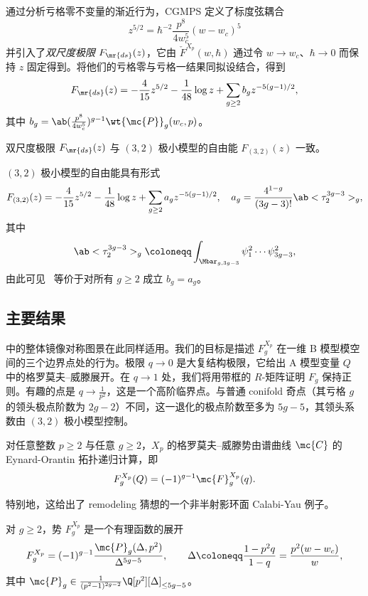 通过分析亏格零不变量的渐近行为，CGMPS 定义了标度弦耦合
\[ z^{5/2} = \hbar^{-2} \frac{p^8}{4w_c^5}(w-w_c)^5 \]
并引入了\textit{双尺度极限} \(F_{\mr{ds}}(z)\)，它由 \(\check{F}^{X_p}(w,\hbar)\) 通过令 \(w \to w_c\)、\(\hbar \to 0\) 而保持 \(z\) 固定得到。将他们的亏格零与亏格一结果同拟设结合，得到
\[ F_{\mr{ds}}(z) = -\frac{4}{15}z^{5/2} - \frac{1}{48}\log z + \sum_{g \geq 2} b_g z^{-5(g-1)/2}, \]
其中 \(b_g = \ab(\frac{p^8}{4w_c^5})^{g-1}\wt{\mc{P}}_g(w_c,p)\)。

\begin{conj}%
\label{conj:cgmps}
    双尺度极限 \(F_{\mr{ds}}(z)\) 与 \((3,2)\) 极小模型的自由能 \(F_{(3,2)}(z)\) 一致。
\end{conj}

\((3,2)\) 极小模型的自由能具有形式
\[ F_{(3,2)}(z) = -\frac{4}{15}z^{5/2} - \frac{1}{48}\log z + \sum_{g\geq2} a_g z^{-5(g-1)/2}, \quad a_g = \frac{4^{1-g}}{(3g-3)!}\ab<\tau_2^{3g-3}>_g, \]
其中
\[ \ab<\tau_2^{3g-3}>_g \coloneqq \int_{\Mbar_{g,3g-3}} \psi_1^2 \cdots \psi_{3g-3}^2, \]
由此可见~ 等价于对所有 \(g \geq 2\) 成立 \(b_g = a_g\)。

\subsection{主要结果}%
\label{sub:The main results (Guo local P1)}

 中的整体镜像对称图景在此同样适用。我们的目标是描述 \(F_g^{X_p}\) 在一维 B 模型模空间的三个边界点处的行为。极限 \(q \to 0\) 是大复结构极限，它给出 A 模型变量 \(Q\) 中的格罗莫夫–威滕展开。在 \(q \to 1\) 处，我们将用带框的 \(R\)-矩阵证明 \(F_g\) 保持正则。有趣的点是 \(q \to \frac{1}{p^2}\)，这是一个高阶临界点。与普通 conifold 奇点（其亏格 \(g\) 的领头极点阶数为 \(2g-2\)）不同，这一退化的极点阶数至多为 \(5g-5\)，其领头系数由 \((3,2)\) 极小模型控制。

\begin{thm}%
\label{thm:local P1 mirror symmetry}
    对任意整数 \(p \geq 2\) 与任意 \(g \geq 2\)，\(X_p\) 的格罗莫夫–威滕势由谱曲线 \(\mc{C}\) 的 Eynard-Orantin 拓扑递归计算，即
    \[ F_g^{X_p}(Q) = (-1)^{g-1}\mc{F}_g^{X_p}(q). \]
\end{thm}

特别地，这给出了 remodeling 猜想的一个非半射影环面 Calabi-Yau 例子。

\begin{thm}%
\label{thm:local P1 rationality}
    对 \(g \geq 2\)，势 \(F_g^{X_p}\) 是一个有理函数的展开
    \[ F_g^{X_p} = (-1)^{g-1}\frac{\mc{P}_g(\Delta,p^2)}{\Delta^{5g-5}}, \qquad \Delta \coloneqq \frac{1-p^2q}{1-q} = \frac{p^2(w-w_c)}{w}, \]
    其中 \(\mc{P}_g \in \frac{1}{(p^2-1)^{2g-2}}\Q[p^2][\Delta]_{\leq 5g-5}\)。
\end{thm}


